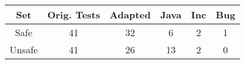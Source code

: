 \begin{tabular}{cccccc}\toprule
\textbf{Set} & \textbf{Orig. Tests} & \textbf{Adapted} & \textbf{Java} & \textbf{Inc} & \textbf{Bug} \\ \midrule
Safe & 41 & 32 & 6 & 2 & 1
\\
Unsafe & 41 & 26 & 13 & 2 & 0
\end{tabular}
